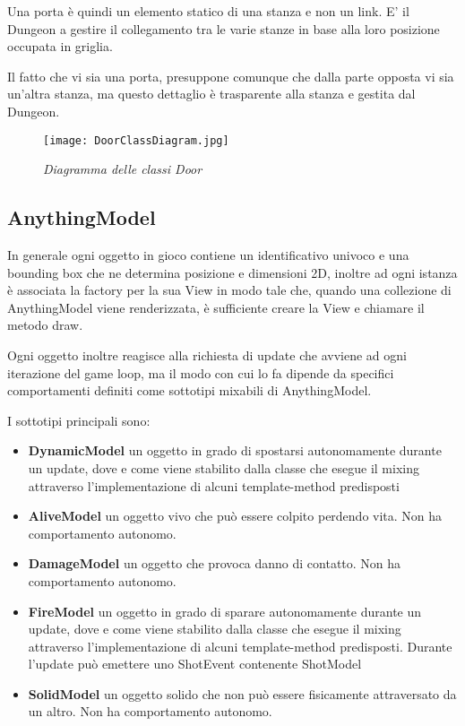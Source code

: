 Una porta è quindi un elemento statico di una stanza e non un link. E' il Dungeon a gestire il collegamento tra le varie stanze in base alla loro posizione occupata in griglia. 

Il fatto che vi sia una porta, presuppone comunque che dalla parte opposta vi sia un'altra stanza, ma questo dettaglio è trasparente alla stanza e gestita dal Dungeon. 
\begin{figure}[!hbt]
    \centering
    \texttt{[image: DoorClassDiagram.jpg]}
    \caption{\textit{Diagramma delle classi Door}} 
\end{figure}

\subsection{AnythingModel}
In generale ogni oggetto in gioco contiene un identificativo univoco e una bounding box che ne determina posizione e dimensioni 2D, inoltre ad ogni istanza è associata la factory per la sua View in modo tale che, quando una collezione di AnythingModel viene renderizzata, è sufficiente creare la View e chiamare il metodo draw. 

Ogni oggetto inoltre reagisce alla richiesta di update che avviene ad ogni iterazione del game loop, ma il modo con cui lo fa dipende da specifici comportamenti definiti come sottotipi mixabili di AnythingModel.

I sottotipi principali sono:
\begin{itemize}
    \item \textbf{DynamicModel} un oggetto in grado di spostarsi autonomamente durante un update, dove e come viene stabilito dalla classe che esegue il mixing attraverso l'implementazione di alcuni template-method predisposti
    \item \textbf{AliveModel} un oggetto vivo che può essere colpito perdendo vita. Non ha comportamento autonomo.
    \item \textbf{DamageModel} un oggetto che provoca danno di contatto. Non ha comportamento autonomo.
    \item \textbf{FireModel} un oggetto in grado di sparare autonomamente durante un update, dove e come viene stabilito dalla classe che esegue il mixing attraverso l'implementazione di alcuni template-method predisposti. Durante l'update può emettere uno ShotEvent contenente ShotModel
    \item \textbf{SolidModel} un oggetto solido che non può essere fisicamente attraversato da un altro. Non ha comportamento autonomo.
\end{itemize}

